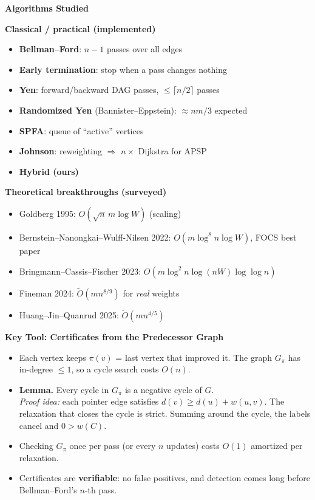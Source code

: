 \documentclass[11pt]{article}
\newcommand{\slide}[1]{\newpage\raggedright{\color{acc}\Large\bfseries #1\par}\vspace{1pt}{\color{acc}\rule{\linewidth}{0.8pt}}\par\vspace{5pt}}
\newcommand{\Ot}{\tilde O}
\begin{document}
\slide{Algorithms Studied}
\begin{minipage}[t]{0.49\linewidth}
\textbf{Classical / practical (implemented)}
\begin{itemize}
\item \textbf{Bellman--Ford}: $n-1$ passes over all edges
\item \textbf{Early termination}: stop when a pass changes nothing
\item \textbf{Yen}: forward/backward DAG passes, $\le\lceil n/2\rceil$ passes
\item \textbf{Randomized Yen} (Bannister--Eppstein): $\approx nm/3$ expected
\item \textbf{SPFA}: queue of ``active'' vertices
\item \textbf{Johnson}: reweighting $\Rightarrow$ $n\times$ Dijkstra for APSP
\item \textbf{Hybrid (ours)}
\end{itemize}
\end{minipage}\hfill
\begin{minipage}[t]{0.47\linewidth}
\textbf{Theoretical breakthroughs (surveyed)}
\begin{itemize}
\item Goldberg 1995: $O(\sqrt n\,m\log W)$ (scaling)
\item Bernstein--Nanongkai--Wulff-Nilsen 2022: $O(m\log^8 n\log W)$, FOCS best paper
\item Bringmann--Cassis--Fischer 2023: $O(m\log^2 n\log(nW)\log\log n)$
\item Fineman 2024: $\Ot(mn^{8/9})$ for \emph{real} weights
\item Huang--Jin--Quanrud 2025: $\Ot(mn^{4/5})$
\end{itemize}
\end{minipage}

\slide{Key Tool: Certificates from the Predecessor Graph}
\begin{itemize}
\item Each vertex keeps $\pi(v)$ = last vertex that improved it. The graph $G_\pi$ has in-degree $\le 1$, so a cycle search costs $O(n)$.
\item \textbf{Lemma.} Every cycle in $G_\pi$ is a negative cycle of $G$.\\[2pt]
{\footnotesize\emph{Proof idea:} each pointer edge satisfies $d(v)\ge d(u)+w(u,v)$. The relaxation that closes the cycle is strict. Summing around the cycle, the labels cancel and $0>w(C)$.}
\item Checking $G_\pi$ once per pass (or every $n$ updates) costs $O(1)$ amortized per relaxation.
\item Certificates are \textbf{verifiable}: no false positives, and detection comes long before Bellman--Ford's $n$-th pass.
\end{itemize}
\end{document}
